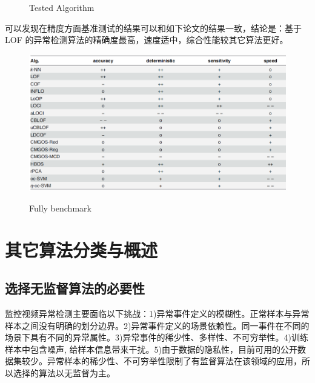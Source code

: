 \documentclass[UTF8]{ctexart}
\begin{document}
\begin{figure}[H]
\caption{Tested Algorithm}
\end{figure}

可以发现在精度方面基准测试的结果可以和如下论文的结果一致，结论是：基于 LOF 的异常检测算法的精确度最高，速度适中，综合性能较其它算法更好。

\begin{figure}[H] %
\centering %
\includegraphics[width=1.0\textwidth]{cite_benchmark1.png} %
\caption{Fully benchmark} %
\protect\cite{Goldstein2016ACE}
\end{figure}
    
\section{其它算法分类与概述}
\subsection{选择无监督算法的必要性}
监控视频异常检测主要面临以下挑战：1)异常事件定义的模糊性。正常样本与异常样本之间没有明确的划分边界。2)异常事件定义的场景依赖性。同一事件在不同的场景下具有不同的异常属性。3)异常事件的稀少性、多样性、不可穷举性。4)训练样本中包含噪声, 给样本信息带来干扰。5)由于数据的隐私性，目前可用的公开数据集较少。异常样本的稀少性、不可穷举性限制了有监督算法在该领域的应用，所以选择的算法以无监督为主。\cite{qh2020}
\end{document}
